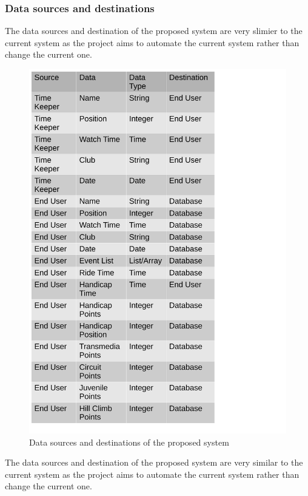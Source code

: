 \subsubsection{Data sources and destinations}

The data sources and destination of the proposed system are very slimier to the current system as the project aims to automate the current system rather than change the current one.

\begin{figure}[H]
	\includegraphics[width=\textwidth]{./DataSourcesPS.pdf}
	 \caption{Data sources and destinations of the proposed system}
\end{figure}

The data sources and destination of the proposed system are very similar to the current system as the project aims to automate the current system rather than change the current one.

